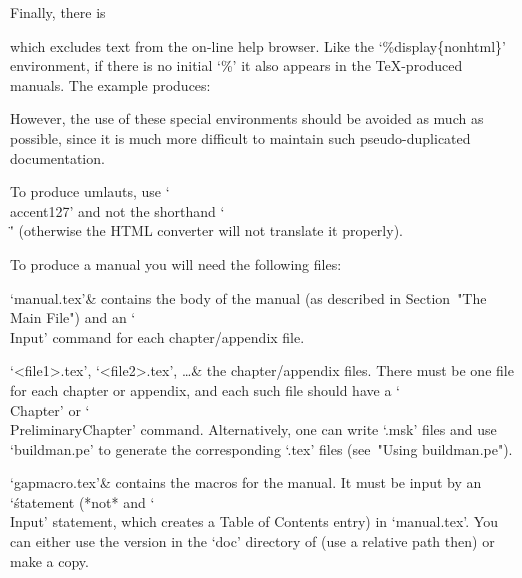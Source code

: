 Finally, there is

\begintt
\endtt

which  excludes  text  from  the   on-line   help   browser.   Like   the
`\%display\{nonhtml\}' environment, if there is no initial `\%'  it  also
appears in the {\TeX}-produced manuals. The example produces:


However, the use of these special environments should be avoided as  much
as  possible,  since  it  is  much  more  difficult  to   maintain   such
pseudo-duplicated documentation.


To produce umlauts,  use  `\\accent127'  and  not  the  shorthand  `\\\"'
(otherwise the HTML converter will not translate it properly).


To produce a manual you will need the following files:

\beginitems
`manual.tex'&
    contains the body of the manual
    (as described in Section~"The Main File")
    and an `\\Input' command for each chapter/appendix file.

`<file1>.tex', `<file2>.tex', \dots &
    the chapter/appendix files. There must be one file for each chapter
    or appendix, and each such file should have a `\\Chapter' or
    `\\PreliminaryChapter' command. Alternatively, one can write
    `.msk' files and use `buildman.pe' to generate the corresponding
    `.tex' files (see~"Using buildman.pe").

`gapmacro.tex'&
    contains the macros for the manual.
    It must be input by an `\' statement (*not* and `\\Input'
    statement, which creates a Table of Contents entry) in `manual.tex'.
    You can either use the version in the `doc' directory of {\GAP}
    (use a relative path then) or make a copy.

